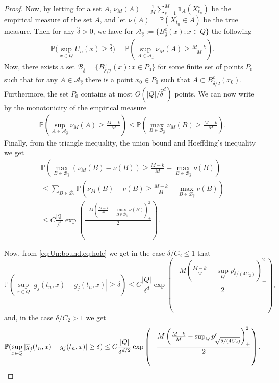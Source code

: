 \documentclass[11pt,reqno,a4paper]{amsart}
\theoremstyle{definition}
\numberwithin{equation}{section}
\newcommand{\widebar}[1]{\overline{#1}}
\renewcommand{\P}{\mathbb{P}}
\DeclareMathOperator{\1}{\mathbbm{1}}
\begin{document}
\begin{proof}
  Now, by letting for a set $A$, $\nu_M(A) = \frac{1}{M} \sum_{s=1}^M \mathbf{1}_A(X_{t_n}^{s})$ be the empirical measure of the set $A$, and let $\nu(A) = \P(X_{t_n}^{1} \in A)$ be the true measure. Then for any $\hat \delta > 0$, we have for $\mathcal{A}_{\hat \delta}:=\{B^c_{\hat \delta}(x); x \in Q\}$ the following
  \begin{align*}
    \P \big (\sup_{x \in Q} U_n(x) \geq \hat \delta \big )
    =
    \P \left (\sup_{A \in \mathcal{A}_{\hat \delta}} \nu_M(A) \geq \frac{M-k}{M} \right ).
  \end{align*}
  Now, there exists a set $\mathcal{B}_{\hat \delta} = \{B^c_{\hat \delta/2}(x): x \in P_0\}$ for some finite set of points $P_0$ such that for any $A \in \mathcal{A}_{\hat \delta}$ there is a point $x_0 \in P_0$ such that $A \subset B^c_{\hat \delta/2}(x_0)$. Furthermore, the set $P_0$ contains at most $O(|Q|/\hat \delta^d)$ points. We can now write by the monotonicity of the empirical measure
  \begin{align*}
    \P\left (\sup_{A \in \mathcal{A}_{\hat \delta}} \nu_M(A) \geq \frac{M-k}{M} \right )
    \leq
    \P\left (\max_{B \in \mathcal{B}_{\hat \delta}} \nu_M(B) \geq \frac{M-k}{M} \right ).
  \end{align*}
  Finally, from the triangle inequality, the union bound and Hoeffding's inequality we get
  \begin{equation} \label{eq:hole}
    \begin{split}
      \P \left (\max_{B \in \mathcal{B}_{\hat \delta}} (\nu_M(B) - \nu(B)) \geq \frac{M-k}{M}-\max_{B \in \mathcal{B}_{\hat \delta}} \nu(B) \right )
      \\
      \leq
      \sum_{B \in \mathcal{B}_{\hat \delta}} \P \left (\nu_M(B) - \nu(B) \geq \frac{M-k}{M}-\max_{B \in \mathcal{B}_{\hat \delta}} \nu(B) \right )
      \\
      \leq
      C \frac{|Q|}{\hat \delta^d} \exp \left ( \frac{-M \left ( \frac{M-k}{M} - \max_{B \in \mathcal{B}_{\hat \delta}} \nu(B) \right )_+^2}{2} \right ).
    \end{split}
  \end{equation}

  Now, from \cref{eq:Un:bound,eq:hole} we get in the case $\delta/C_2 \leq 1$ that
  \begin{equation*}
    \P(\sup_{x \in Q} |\widebar{g}_j(t_n,x) - g_j(t_n,x)| \geq \delta)
    \leq C \frac{|Q|}{\delta^d} \exp \left (-\frac{M \left (\frac{M-k}{M} - \sup_Q p_{\delta/(4 C_2)}^c \right )_+^2}{2} \right ),
  \end{equation*}
  and, in the case $\delta/C_2 > 1$ we get
  \begin{equation*}
    \P(\sup_{x \in Q} |\widebar{g}_j(t_n,x) - g_j(t_n,x)| \geq \delta)
    \\
    \leq C \frac{|Q|}{\delta^{d/2}} \exp \left (-\frac{M \left (\frac{M-k}{M} - \sup_Q p_{\sqrt{\delta/(4 C_2)}}^c \right )_+^2}{2} \right ).
  \end{equation*}
\end{proof}
\end{document}
